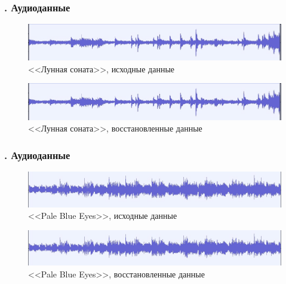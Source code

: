 \documentclass[t aspectratio=169]{beamer}
\begin{document}
  \begin{frame}\frametitle{\insertsection . Аудиоданные}
      \begin{figure}
        \begin{center}
          \includegraphics[width=1\textwidth]{./images/MS-init.jpg}
        \end{center}
        \caption{<<Лунная соната>>, исходные данные}
      \end{figure}

      \begin{figure}
        \begin{center}
          \includegraphics[width=1\textwidth]{./images/MS-init.jpg}
        \end{center}
        \caption{<<Лунная соната>>, восстановленные данные}
      \end{figure}
  \end{frame}

  \begin{frame}\frametitle{\insertsection . Аудиоданные}
      \begin{figure}
        \begin{center}
          \includegraphics[width=1\textwidth]{./images/PBE-init.jpg}
        \end{center}
        \caption{<<Pale Blue Eyes>>, исходные данные}
      \end{figure}

      \begin{figure}
        \begin{center}
          \includegraphics[width=1\textwidth]{./images/PBE-init.jpg}
        \end{center}
        \caption{<<Pale Blue Eyes>>, восстановленные данные}
      \end{figure}
  \end{frame}
\end{document}
